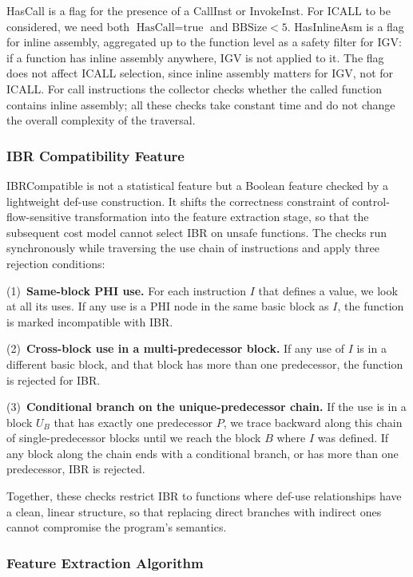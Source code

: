 \documentclass[5p,times,authoryear]{elsarticle}
\theoremstyle{plain}
\theoremstyle{definition}
\theoremstyle{remark}
\begin{document}
HasCall is a flag for the presence of a CallInst or InvokeInst. For ICALL to be
considered, we need both $\text{HasCall} = \text{true}$ and $\text{BBSize} < 5$.
HasInlineAsm is a flag for inline assembly, aggregated up to the function level as a
safety filter for IGV: if a function has inline assembly anywhere, IGV is not applied
to it. The flag does not affect ICALL selection, since inline assembly matters for
IGV, not for ICALL. For call instructions the collector checks whether the called
function contains inline assembly; all these checks take constant time and do not
change the overall complexity of the traversal.

\subsubsection{IBR Compatibility Feature}

IBRCompatible is not a statistical feature but a Boolean feature checked by a
lightweight def-use construction. It shifts the correctness constraint of
control-flow-sensitive transformation into the feature extraction stage, so that the
subsequent cost model cannot select IBR on unsafe functions. The checks run
synchronously while traversing the use chain of instructions and apply three rejection
conditions:

(1)~\textbf{Same-block PHI use.} For each instruction $I$ that defines a value, we
look at all its uses. If any use is a PHI node in the same basic block as $I$, the
function is marked incompatible with IBR.

(2)~\textbf{Cross-block use in a multi-predecessor block.} If any use of $I$ is in a
different basic block, and that block has more than one predecessor, the function is
rejected for IBR.

(3)~\textbf{Conditional branch on the unique-predecessor chain.} If the use is in a
block $U_B$ that has exactly one predecessor $P$, we trace backward along this chain
of single-predecessor blocks until we reach the block $B$ where $I$ was defined. If
any block along the chain ends with a conditional branch, or has more than one
predecessor, IBR is rejected.

Together, these checks restrict IBR to functions where def-use relationships have a
clean, linear structure, so that replacing direct branches with indirect ones cannot
compromise the program's semantics.

\subsubsection{Feature Extraction Algorithm}
\end{document}
